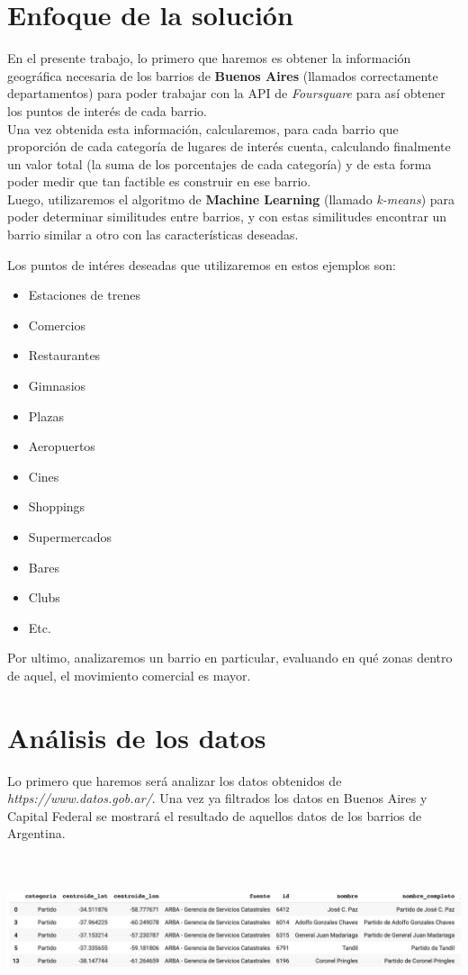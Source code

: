 \documentclass[12pt,a4paper]{tesis}
\begin{document}
\chapter{Enfoque de la solución}
En el presente trabajo, lo primero que haremos es obtener la información geográfica necesaria de los barrios de \textbf{Buenos Aires} (llamados correctamente departamentos) para poder trabajar con la API de \textit{Foursquare} para así obtener los puntos de interés de cada barrio.  \\
Una vez obtenida esta información, calcularemos, para cada barrio que proporción de cada categoría de lugares de interés cuenta, calculando finalmente un valor total (la suma de los porcentajes de cada categoría) y de esta forma poder medir que tan factible es construir en ese barrio. \\

Luego, utilizaremos el algoritmo de \textbf{Machine Learning} (llamado \textit{k-means}) para poder determinar similitudes entre barrios, y con estas similitudes encontrar un barrio similar a otro con las características deseadas.

Los puntos de intéres deseadas que utilizaremos en estos ejemplos son:

\begin{itemize}
\item Estaciones de trenes
\item Comercios
\item Restaurantes
\item Gimnasios
\item Plazas
\item Aeropuertos
\item Cines
\item Shoppings
\item Supermercados
\item Bares
\item Clubs
\item Etc.
\end{itemize}




Por ultimo, analizaremos un barrio en particular, evaluando en qué zonas dentro de aquel, el movimiento comercial es mayor. 

\chapter{Análisis de los datos}
Lo primero que haremos será analizar los datos obtenidos de \textit{https://www.datos.gob.ar/}. Una vez ya filtrados los datos en Buenos Aires y Capital Federal se mostrará el resultado de aquellos datos de los barrios de Argentina. \\
\\
\\
\centerline{
	\includegraphics[scale=0.36]{tabla1}
}
\\
\\
\end{document}
